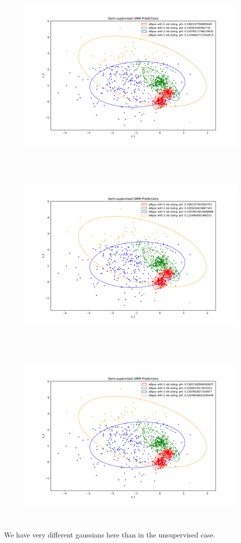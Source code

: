 %
%
\begin{answer}
	\begin{figure}[H]
		\includegraphics[width=15cm,height=9cm,keepaspectratio]{../src/semi_supervised_em/pred_ss_0.pdf}
	\end{figure}
	\begin{figure}[H]
		\includegraphics[width=15cm,height=9cm,keepaspectratio]{../src/semi_supervised_em/pred_ss_1.pdf}
	\end{figure}
	\begin{figure}[H]
		\includegraphics[width=15cm,height=9cm,keepaspectratio]{../src/semi_supervised_em/pred_ss_2.pdf}
	\end{figure}
	We have very different gaussians here than in the unsupervised case.
\end{answer}
%


